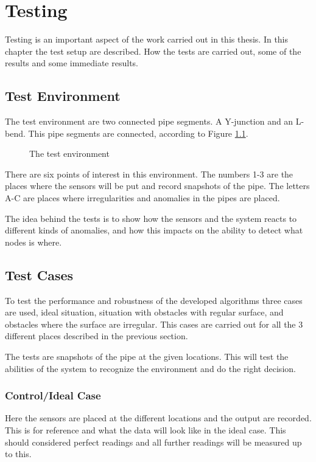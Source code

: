 \chapter{Testing}
Testing is an important aspect of the work carried out in this thesis. In this chapter the
test setup are described. How the tests are carried out, some of the results and some
immediate results.


\section{Test Environment}
The test environment are two connected pipe segments. A Y-junction and an L-bend. This
pipe segments are connected, according to Figure \ref{chap7:fig-environment}.

\begin{figure}[htbp]
    \centering
    \caption{The test environment}
    \label{chap7:fig-environment}
\end{figure}

There are six points of interest in this environment. 
The numbers 1-3 are the places where the sensors will be put and record snapshots of the pipe. 
The letters A-C are places where irregularities and anomalies in the pipes are placed. 

The idea behind the tests is to show how the sensors and the system reacts to different
kinds of anomalies, and how this impacts on the ability to detect what nodes is where. 


\section{Test Cases}
To test the performance and robustness of the developed algorithms three cases are used,
ideal situation, situation with obstacles with regular surface, and obstacles where the
surface are irregular. This cases are carried out for all the 3 different places described
in the previous section.

The tests are snapshots of the pipe at the given locations. This will test the abilities
of the system to recognize the environment and do the right decision. 


\subsection{Control/Ideal Case}
Here the sensors are placed at the different locations and the output are recorded. This
is for reference and what the data will look like in the ideal case. This should
considered perfect readings and all further readings will be measured up to this.


